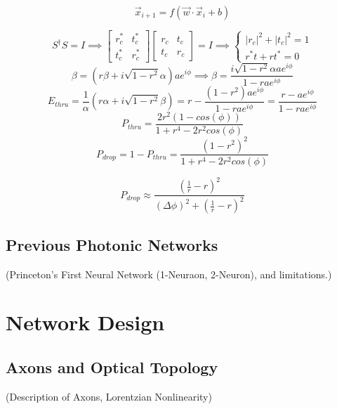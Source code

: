 \documentclass[12pt]{article}
\begin{document}
\begin{equation}
\vec{x}_{i+1} = f(\vec{w}\cdot\vec{x}_i + b)
\end{equation}

\begin{equation}
S^\dag S = I \implies \begin{bmatrix}
r_c^* & t_c^* \\
t_c^* & r_c^*
\end{bmatrix}
\begin{bmatrix}
r_c & t_c \\
t_c & r_c
\end{bmatrix} = I \implies \begin{cases}
|r_c|^2 + |t_c|^2 = 1 \\
r^*t + rt^* = 0
\end{cases}
\end{equation}
\begin{equation}
\beta = (r\beta + i\sqrt{1 - r^2}\alpha)ae^{i\phi} \implies \beta = \frac{i\sqrt{1-r^2}\alpha a e^{i\phi}}{1 - rae^{i\phi}}
\end{equation}
\begin{equation}
E_{thru} = \frac{1}{\alpha}(r\alpha + i\sqrt{1-r^2}\beta) = r - \frac{(1-r^2)a e^{i\phi}}{1 - rae^{i\phi}} = \frac{r-ae^{i\phi}}{1 - rae^{i\phi}}
\end{equation}
\begin{equation}
P_{thru} = \frac{2r^2(1-cos(\phi))}{1 + r^4 - 2r^2cos(\phi)}
\end{equation}
\begin{equation}
P_{drop} = 1-P_{thru} = \frac{(1-r^2)^2}{1 + r^4 - 2r^2cos(\phi)}
\end{equation}

\begin{equation}
P_{drop} \approx \frac{(\frac{1}{r}-r)^2}{(\Delta\phi)^2 + (\frac{1}{r}-r)^2}
\end{equation}

\subsection{Previous Photonic Networks}
(Princeton's First Neural Network (1-Neuraon, 2-Neuron), and limitations.)

\section{Network Design}
\subsection{Axons and Optical Topology}
(Description of Axons, Lorentzian Nonlinearity)
\end{document}
